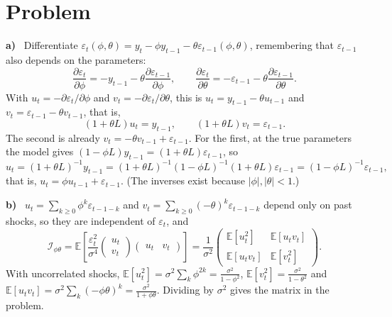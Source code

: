 \documentclass[11pt]{article}
\newcommand{\E}{\mathbb{E}}
\newcounter{problem}
\renewcommand{\theproblem}{\arabic{problem}}
\newcommand{\problem}{
	\stepcounter{problem}
	\section*{Problem \theproblem}
}
\newcommand{\itm}[1]{\par\textbf{#1)}\ }
\begin{document}
\problem

\itm{a}
Differentiate $\varepsilon_t(\phi,\theta)=y_t-\phi y_{t-1}-\theta\varepsilon_{t-1}(\phi,\theta)$, remembering that $\varepsilon_{t-1}$ also depends on the parameters:
\[
\frac{\partial\varepsilon_t}{\partial\phi}=-y_{t-1}-\theta\frac{\partial\varepsilon_{t-1}}{\partial\phi},\qquad
\frac{\partial\varepsilon_t}{\partial\theta}=-\varepsilon_{t-1}-\theta\frac{\partial\varepsilon_{t-1}}{\partial\theta}.
\]
With $u_t=-\partial\varepsilon_t/\partial\phi$ and $v_t=-\partial\varepsilon_t/\partial\theta$, this is $u_t=y_{t-1}-\theta u_{t-1}$ and $v_t=\varepsilon_{t-1}-\theta v_{t-1}$, that is,
\[
(1+\theta L)u_t=y_{t-1},\qquad (1+\theta L)v_t=\varepsilon_{t-1}.
\]
The second is already $v_t=-\theta v_{t-1}+\varepsilon_{t-1}$. For the first, at the true parameters the model gives $(1-\phi L)y_{t-1}=(1+\theta L)\varepsilon_{t-1}$, so
\[
u_t=(1+\theta L)^{-1}y_{t-1}=(1+\theta L)^{-1}(1-\phi L)^{-1}(1+\theta L)\varepsilon_{t-1}=(1-\phi L)^{-1}\varepsilon_{t-1},
\]
that is, $u_t=\phi u_{t-1}+\varepsilon_{t-1}$. (The inverses exist because $|\phi|,|\theta|<1$.)

\itm{b}
$u_t=\sum_{k\ge0}\phi^k\varepsilon_{t-1-k}$ and $v_t=\sum_{k\ge0}(-\theta)^k\varepsilon_{t-1-k}$ depend only on past shocks, so they are independent of $\varepsilon_t$, and
\[
\mathcal I_{\phi\theta}=\E\left[\frac{\varepsilon_t^2}{\sigma^4}\begin{pmatrix}u_t\\v_t\end{pmatrix}\begin{pmatrix}u_t&v_t\end{pmatrix}\right]=\frac1{\sigma^2}\begin{pmatrix}\E[u_t^2]&\E[u_tv_t]\\\E[u_tv_t]&\E[v_t^2]\end{pmatrix}.
\]
With uncorrelated shocks, $\E[u_t^2]=\sigma^2\sum_k\phi^{2k}=\frac{\sigma^2}{1-\phi^2}$, $\E[v_t^2]=\frac{\sigma^2}{1-\theta^2}$ and $\E[u_tv_t]=\sigma^2\sum_k(-\phi\theta)^k=\frac{\sigma^2}{1+\phi\theta}$. Dividing by $\sigma^2$ gives the matrix in the problem.
\end{document}
